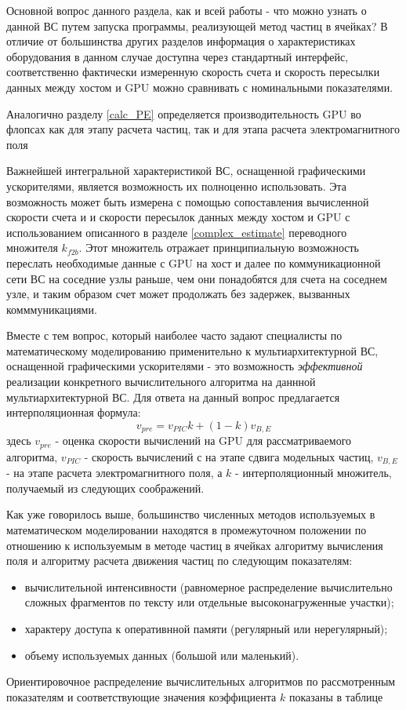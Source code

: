 Основной вопрос данного раздела, как и всей работы - что можно узнать о данной ВС путем запуска программы, реализующей метод частиц в ячейках? В отличие от 	большинства других разделов информация о характеристиках оборудования в данном случае доступна через стандартный интерфейс, соответственно фактически измеренную скорость счета и скорость пересылки данных между хостом и GPU можно сравнивать с номинальными показателями.

Аналогично разделу \ref{calc_PE} определяется производительность GPU во флопсах как для этапу расчета частиц, так и для этапа расчета электромагнитного поля

Важнейшей интегральной характеристикой ВС, оснащенной графическими ускорителями, является возможность их полноценно использовать. Эта возможность
может быть измерена с помощью сопоставления вычисленной скорости счета и и скорости пересылок данных между хостом и GPU с использованием описанного 
в разделе \ref{complex_estimate} переводного множителя $k_{f2b}$. Этот множитель отражает принципиальную возможность переслать необходимые данные с GPU на хост и далее по коммуникационной сети ВС на соседние узлы раньше, чем они понадобятся для счета на соседнем узле, и таким образом счет может продолжать без задержек, вызванных комммуникациями.

Вместе с тем вопрос, который наиболее часто задают специалисты по математическому моделированию применительно к мультиархитектурной ВС, оснащенной графическими ускорителями - это возможность \textit{эффективной} реализации конкретного вычислительного алгоритма на даннной мультиархитектурной ВС.
Для ответа на данный вопрос предлагается интерполяционная формула:
\begin{equation}
v_{pre} = v_{PIC} k + (1-k) v_{B,E}
\end{equation} 
здесь $ v_{pre}$ - оценка скорости вычислений на GPU для рассматриваемого алгоритма, $v_{PIC}$ - скорость вычислений с на этапе сдвига модельных частиц, $v_{B,E}$ - на этапе расчета электромагнитного поля, а $k$ - интерполяционный множитель, получаемый из следующих соображений.

Как уже говорилось выше, большинство численных методов используемых в математическом моделировании находятся в промежуточном положении по отношению к используемым в методе частиц в ячейках алгоритму вычисления поля и алгоритму расчета движения частиц по следующим показателям:
\begin{itemize}
	\item вычислительной интенсивности (равномерное распределение вычислительно сложных фрагментов по тексту или отдельные высоконагруженные участки);
	\item характеру доступа к оперативнной памяти (регулярный или нерегулярный);
	\item объему используемых данных (большой или маленький).
\end{itemize}
Ориентировочное распределение вычислительных алгоритмов по рассмотренным показателям и соответствующие значения коэффициента $k$ показаны в таблице 


